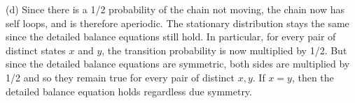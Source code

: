 (d) Since there is a 1/2 probability of the chain not moving, the chain now has self loops, and is therefore aperiodic. The stationary distribution stays the same since the detailed balance equations still hold. In particular, for every pair of distinct states $x$ and $y$, the transition probability is now multiplied by 1/2. But since the detailed balance equations are symmetric, both sides are multiplied by 1/2 and so they remain true for every pair of distinct $x, y$. If $x = y$, then the detailed balance equation holds regardless due symmetry.
